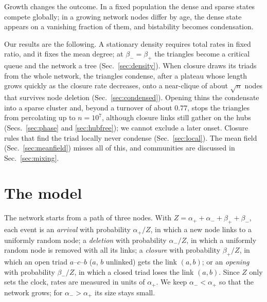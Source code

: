 \documentclass[aps,pre,twocolumn,superscriptaddress,floatfix,nofootinbib]{revtex4-2}
\begin{document}
Growth changes the outcome. In a fixed population the dense and sparse states
compete globally; in a growing network nodes differ by age, the dense state
appears on a vanishing fraction of them, and bistability becomes
condensation.

Our results are the following. A stationary density requires total rates in
fixed ratio, and it fixes the mean degree; at $\beta_-=\beta_+$ the triangles
become a critical queue and the network a tree (Sec.~\ref{sec:density}). When
closure draws its triads from the whole network, the triangles condense, after
a plateau whose length grows quickly as the closure rate decreases, onto a
near-clique of about $\sqrt n$ nodes that survives node deletion
(Sec.~\ref{sec:condensed}). Opening thins the condensate into a sparse cluster
and, beyond a turnover of about $0.77$, stops the triangles from percolating up
to $n=10^7$, although closure links still gather on the hubs
(Secs.~\ref{sec:phase} and \ref{sec:hubfree}); we cannot exclude a later onset.
Closure rules that find the triad locally never condense
(Sec.~\ref{sec:local}). The mean field (Sec.~\ref{sec:meanfield}) misses all of
this, and communities are discussed in Sec.~\ref{sec:mixing}.

\section{The model}
\label{sec:model}

The network starts from a path of three nodes. With
$Z=\alpha_++\alpha_-+\beta_++\beta_-$, each event is an \emph{arrival} with
probability $\alpha_+/Z$, in which a new node links to a uniformly random node;
a \emph{deletion} with probability $\alpha_-/Z$, in which a uniformly random
node is removed with all its links; a \emph{closure} with probability
$\beta_+/Z$, in which an open triad $a$--$c$--$b$ ($a$, $b$ unlinked) gets the
link $(a,b)$; or an \emph{opening} with probability $\beta_-/Z$, in which a
closed triad loses the link $(a,b)$. Since $Z$ only sets the clock,
rates are measured in units of $\alpha_+$. We keep $\alpha_-<\alpha_+$ so that
the network grows; for $\alpha_->\alpha_+$ its size stays small.
\end{document}
